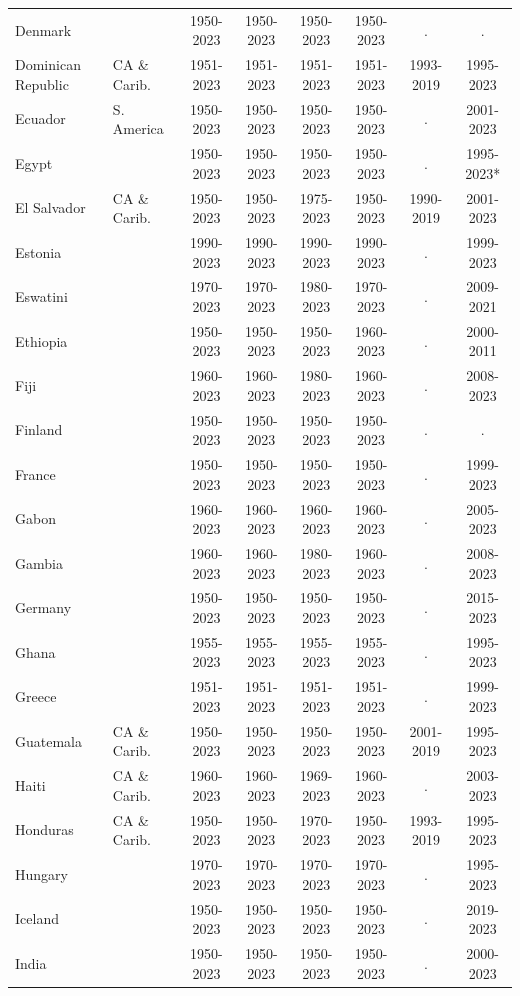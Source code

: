 \begin{longtable}{ll*{6}{c}}
Denmark &  & 1950-2023 & 1950-2023 & 1950-2023 & 1950-2023 & . & . \\
Dominican Republic & CA \& Carib. & 1951-2023 & 1951-2023 & 1951-2023 & 1951-2023 & 1993-2019 & 1995-2023 \\
Ecuador & S. America & 1950-2023 & 1950-2023 & 1950-2023 & 1950-2023 & . & 2001-2023 \\
Egypt &  & 1950-2023 & 1950-2023 & 1950-2023 & 1950-2023 & . & 1995-2023* \\
El Salvador & CA \& Carib. & 1950-2023 & 1950-2023 & 1975-2023 & 1950-2023 & 1990-2019 & 2001-2023 \\
Estonia &  & 1990-2023 & 1990-2023 & 1990-2023 & 1990-2023 & . & 1999-2023 \\
Eswatini &  & 1970-2023 & 1970-2023 & 1980-2023 & 1970-2023 & . & 2009-2021 \\
Ethiopia &  & 1950-2023 & 1950-2023 & 1950-2023 & 1960-2023 & . & 2000-2011 \\
Fiji &  & 1960-2023 & 1960-2023 & 1980-2023 & 1960-2023 & . & 2008-2023 \\
Finland &  & 1950-2023 & 1950-2023 & 1950-2023 & 1950-2023 & . & . \\
France &  & 1950-2023 & 1950-2023 & 1950-2023 & 1950-2023 & . & 1999-2023 \\
Gabon &  & 1960-2023 & 1960-2023 & 1960-2023 & 1960-2023 & . & 2005-2023 \\
Gambia &  & 1960-2023 & 1960-2023 & 1980-2023 & 1960-2023 & . & 2008-2023 \\
Germany &  & 1950-2023 & 1950-2023 & 1950-2023 & 1950-2023 & . & 2015-2023 \\
Ghana &  & 1955-2023 & 1955-2023 & 1955-2023 & 1955-2023 & . & 1995-2023 \\
Greece &  & 1951-2023 & 1951-2023 & 1951-2023 & 1951-2023 & . & 1999-2023 \\
Guatemala & CA \& Carib. & 1950-2023 & 1950-2023 & 1950-2023 & 1950-2023 & 2001-2019 & 1995-2023 \\
Haiti & CA \& Carib. & 1960-2023 & 1960-2023 & 1969-2023 & 1960-2023 & . & 2003-2023 \\
Honduras & CA \& Carib. & 1950-2023 & 1950-2023 & 1970-2023 & 1950-2023 & 1993-2019 & 1995-2023 \\
Hungary &  & 1970-2023 & 1970-2023 & 1970-2023 & 1970-2023 & . & 1995-2023 \\
Iceland &  & 1950-2023 & 1950-2023 & 1950-2023 & 1950-2023 & . & 2019-2023 \\
India &  & 1950-2023 & 1950-2023 & 1950-2023 & 1950-2023 & . & 2000-2023 \\

\end{longtable}
